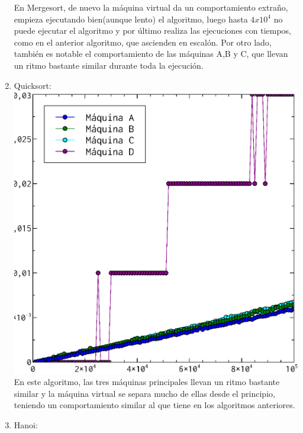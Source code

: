 \documentclass[a4paper, 11pt]{article}
\begin{document}
\begin{enumerate}
  En Mergesort, de nuevo la máquina virtual da un comportamiento extraño, empieza ejecutando bien(aunque lento) el algoritmo, luego hasta $4x10^4$ no puede ejecutar el algoritmo y por último realiza las ejecuciones con tiempos, como en el anterior algoritmo, que ascienden en escalón. Por otro lado, también es notable el comportamiento de las máquinas A,B y C, que llevan un ritmo bastante similar durante toda la ejecución.
  \item Quicksort:\\
  \includegraphics[scale=0.5]{quicksort_todos.eps}\\
  En este algoritmo, las tres máquinas principales llevan un ritmo bastante similar y la máquina virtual se separa mucho de ellas desde el principio, teniendo un comportamiento similar al que tiene en los algoritmos anteriores.
  \item Hanoi:\\

\end{enumerate}
\end{document}
